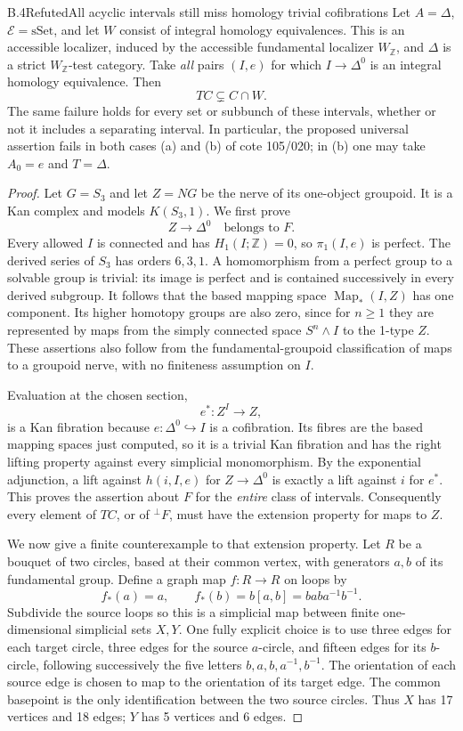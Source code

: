 \begin{claim}{B.4}{Refuted}{All acyclic intervals still miss homology trivial cofibrations}\label{B4}
Let $A=\Delta$, $\mathscr E=\mathrm{sSet}$, and let $W$ consist of integral
homology equivalences.  This is an accessible localizer, induced by the
accessible fundamental localizer $W_{\mathbb Z}$, and $\Delta$ is a strict
$W_{\mathbb Z}$-test category.  Take \emph{all} pairs $(I,e)$ for which
$I\to\Delta^0$ is an integral homology equivalence.  Then
\[
 TC\subsetneq C\cap W.
\]
The same failure holds for every set or subbunch of these intervals, whether
or not it includes a separating interval.  In particular, the proposed
universal assertion fails in both cases (a) and (b) of cote 105/020; in (b)
one may take $A_0=e$ and $T=\Delta$.
\end{claim}
\begin{proof}
Let $G=S_3$ and let $Z=NG$ be the nerve of its one-object groupoid.  It is a
Kan complex and models $K(S_3,1)$.  We first prove
\[
                 Z\longrightarrow\Delta^0\quad\text{belongs to }F.
\]
Every allowed $I$ is connected and has $H_1(I;\mathbb Z)=0$, so
$\pi_1(I,e)$ is perfect.  The derived series of $S_3$ has orders $6,3,1$.
A homomorphism from a perfect group to a solvable group is trivial: its image
is perfect and is contained successively in every derived subgroup.
It follows that the based mapping space $\operatorname{Map}_*(I,Z)$ has
one component.  Its higher homotopy groups are also zero, since for $n\geq1$
they are represented by maps from the simply connected space
$S^n\wedge I$ to the 1-type $Z$.  These assertions also follow from the
fundamental-groupoid classification of maps to a groupoid nerve, with no
finiteness assumption on $I$.

Evaluation at the chosen section,
\[
            e^*:Z^I\longrightarrow Z,
\]
is a Kan fibration because $e:\Delta^0\hookrightarrow I$ is a cofibration.
Its fibres are the based mapping spaces just computed, so it is a trivial
Kan fibration and has the right lifting property against every simplicial
monomorphism.  By the exponential adjunction, a lift against
$h(i,I,e)$ for $Z\to\Delta^0$ is exactly a lift against $i$ for $e^*$.
This proves the assertion about $F$ for the \emph{entire} class of intervals.
Consequently every element of $TC$, or of ${}^{\perp}F$, must have the
extension property for maps to $Z$.

We now give a finite counterexample to that extension property.  Let $R$
be a bouquet of two circles, based at their common vertex, with generators
$a,b$ of its fundamental group.  Define a graph map $f:R\to R$ on loops by
\[
             f_*(a)=a,\qquad f_*(b)=b[a,b]=bab a^{-1}b^{-1}.
\]
Subdivide the source loops so this is a simplicial map between finite
one-dimensional simplicial sets $X,Y$.  One fully explicit choice is to use
three edges for each target circle, three edges for the source $a$-circle,
and fifteen edges for its $b$-circle, following successively the five letters
$b,a,b,a^{-1},b^{-1}$.  The orientation of each source edge is chosen to map
to the orientation of its target edge.  The common basepoint is the only
identification between the two source circles.  Thus $X$ has 17 vertices
and 18 edges; $Y$ has 5 vertices and 6 edges.


\end{proof}

